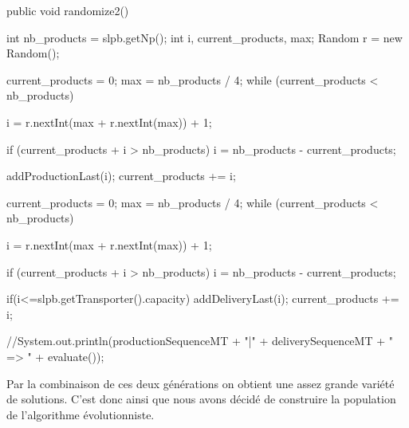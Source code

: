 \begin{java}
public void randomize2() {
	int nb_products = slpb.getNp();
	int i, current_products, max;
	Random r = new Random();
	
	current_products = 0;
	max = nb_products / 4;
	while (current_products < nb_products) {
		i = r.nextInt(max + r.nextInt(max)) + 1;
		
		if (current_products + i > nb_products) {
			i = nb_products - current_products;
		}
		
		addProductionLast(i);
		current_products += i;
	}
	
	current_products = 0;
	max = nb_products / 4;
	while (current_products < nb_products) {
		i = r.nextInt(max + r.nextInt(max)) + 1;
		
		if (current_products + i > nb_products) {
			i = nb_products - current_products;
		}
		
		if(i<=slpb.getTransporter().capacity) {
			addDeliveryLast(i);
			current_products += i;
		}
	}
	
	//System.out.println(productionSequenceMT + "|" + deliverySequenceMT + " => " + evaluate());
}

\end{java}
\vspace{1em}
Par la combinaison de ces deux générations on obtient une assez grande variété de solutions. C'est donc ainsi que nous avons décidé de construire la population de l'algorithme évolutionniste.